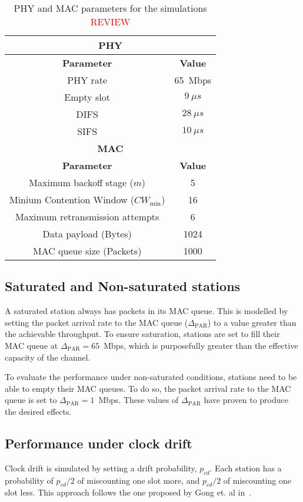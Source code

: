 	\begin{table}
		\centering
		\caption{PHY and MAC parameters for the simulations \textcolor{red}{REVIEW}}
		\label{tab:mac-params}
		\begin{tabular}{|c|c|}
			\hline
			\multicolumn{2}{|c|}{{\bfseries PHY}}\\
			\hline
			{\bfseries Parameter} & {\bfseries Value}\\
			\hline
			PHY rate & 65~Mbps\\
			Empty slot & $9~\mu s$\\
			DIFS & $28~\mu s$\\
			SIFS & $10~\mu s$\\
			\hline
			\multicolumn{2}{|c|}{{\bfseries MAC}}\\
			\hline
			{\bfseries Parameter} & {\bfseries Value}\\
			\hline
			Maximum backoff stage ($m$) & 5\\
			Minium Contention Window ($CW_{\min}$) & 16\\
			Maximum retransmission attempts & 6\\
			Data payload (Bytes) & 1024\\
			MAC queue size (Packets) & 1000\\
			\hline
		\end{tabular}
	\end{table}
	
	\subsection{Saturated and Non-saturated stations}\label{unsaturation}
	A saturated station always has packets in its MAC queue. This is modelled by setting the packet arrival rate to the MAC queue ($\Delta_{\text{PAR}}$) to a value greater than the achievable throughput. To ensure saturation, stations are set to fill their MAC queue at $\Delta_{\text{PAR}}=65$~Mbps, which is purposefully greater than the effective capacity of the channel.
	
	To evaluate the performance under non-saturated conditions, stations need to be able to empty their MAC queues. To do so, the packet arrival rate to the MAC queue is set to $\Delta_{\text{PAR}}=1$~Mbps. These values of $\Delta_{\text{PAR}}$ have proven to produce the desired effects.
	
	\subsection{Performance under clock drift}
	Clock drift is simulated by setting a drift probability, $p_{cd}$. Each station has a probability of $p_{cd}/2$ of miscounting one slot more, and $p_{cd}/2$ of miscounting one slot less. This approach follows the one proposed by Gong et. al in~\cite{slotDrift}.
	
